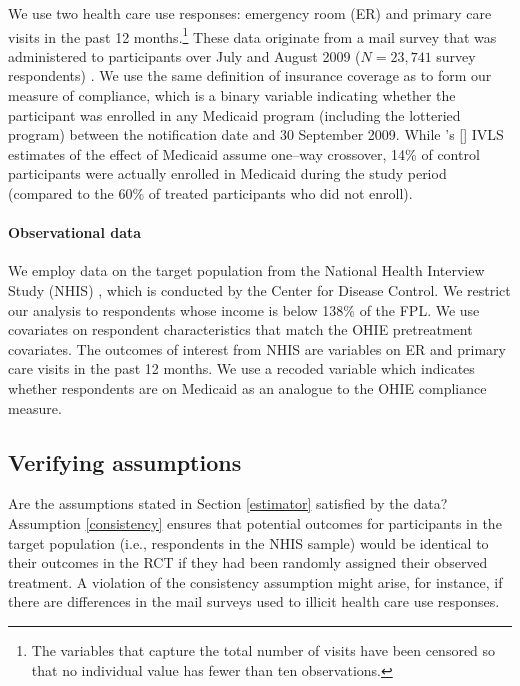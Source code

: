 \documentclass[12pt]{article}
\newcommand{\possessivecite}[1]{\citeauthor{#1}'s [\citeyear{#1}]}
\begin{document}
We use two health care use responses: emergency room (ER) and primary care visits in the past 12 months.\footnote{The variables that capture the total number of visits have been censored so that no individual value has fewer than ten observations.} These data originate from a mail survey that was administered to participants over July and August 2009 ($N = 23,741$ survey respondents) \cite{finkelstein2012}. We use the same definition of insurance coverage as \citet{finkelstein2012} to form our measure of compliance, which is a binary variable indicating whether the participant was enrolled in any Medicaid program (including the lotteried program) between the notification date and 30 September 2009. While \possessivecite{finkelstein2012} IVLS estimates of the effect of Medicaid assume one--way crossover, 14\% of control participants were actually enrolled in Medicaid during the study period (compared to the 60\% of treated participants who did not enroll). 

\paragraph{Observational data} 

We employ data on the target population from the National Health Interview Study (NHIS) \cite{NHIS}, which is conducted by the Center for Disease Control.  We restrict our analysis to respondents whose income is below 138\% of the FPL. We use covariates on respondent characteristics that match the OHIE pretreatment covariates. The outcomes of interest from NHIS are variables on ER  and primary care visits in the past 12 months. We use a recoded variable which indicates whether respondents are on Medicaid as an analogue to the OHIE compliance measure.

\subsection{Verifying assumptions}

Are the assumptions stated in Section \ref{estimator} satisfied by the data? Assumption \eqref{consistency} ensures that potential outcomes for participants in the target population (i.e., respondents in the NHIS sample) would be identical to their outcomes in the RCT if they had been randomly assigned their observed treatment. A violation of the consistency assumption might arise, for instance, if there are differences in the mail surveys used to illicit health care use responses.
\end{document}
